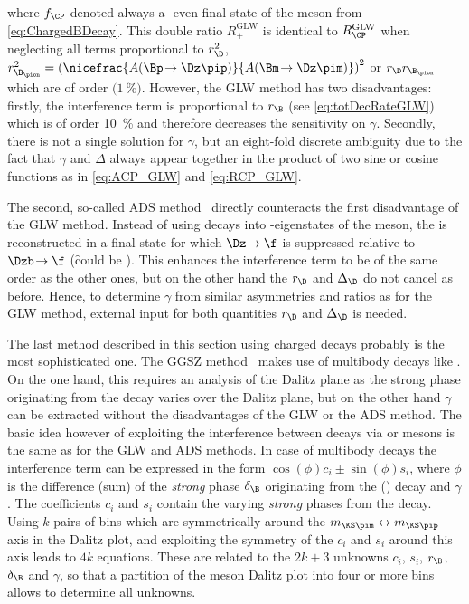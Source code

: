  where $f_{\CP}$ denoted always a \CP-even final state of the \D meson from \cref{eq:ChargedBDecay}.
This double ratio $R_{+}^{\text{GLW}}$ is identical to $R_{\CP}^{\text{GLW}}$ when neglecting all terms proportional to $r_\D^2$, $r_{\B_\pion}^2=\left(\nicefrac{A\!\left(\Bp\!\to\Dz\pip\right)}{A\!\left(\Bm\!\to\Dz\pim\right)}\right)^2$ or $r_\D r_{\B_\pion}$ which are of order $\mathcal(\SI{1}{\percent})$.
However, the GLW method has two disadvantages: firstly, the interference term is proportional to $r_\B$ (see \cref{eq:totDecRateGLW}) which is of order \SI{10}{\percent} and therefore decreases the sensitivity on $\gamma$.
Secondly, there is not a single solution for $\gamma$, but an eight-fold discrete ambiguity due to the fact that $\gamma$ and $\Delta$ always appear together in the product of two sine or cosine functions as in \cref{eq:ACP_GLW} and \cref{eq:RCP_GLW}.

The second, so-called ADS method~\cite{ADS} directly counteracts the first disadvantage of the GLW method.
Instead of using decays into \CP-eigenstates of the \D meson, the \D is reconstructed in a final state for which $\Dz\!\to\f$ is suppressed relative to $\Dzb\!\to\f$ (\eg \f could be \Km\pip).
This enhances the interference term to be of the same order as the other ones, but on the other hand the $r_\D$ and $\Delta_\D$ do not cancel as before.
Hence, to determine $\gamma$ from similar asymmetries and ratios as for the GLW method, external input for both quantities $r_\D$ and $\Delta_\D$ is needed.

The last method described in this section using charged \B decays probably is the most sophisticated one.
The GGSZ method~\cite{Giri:2003ty} makes use of multibody \D decays like \KS\pip\pim.
On the one hand, this requires an analysis of the Dalitz plane as the strong phase originating from the \D decay varies over the Dalitz plane, but on the other hand $\gamma$ can be extracted without the disadvantages of the GLW or the ADS method.
The basic idea however of exploiting the interference between \Bp decays via \Dz or \Dzb mesons is the same as for the GLW and ADS methods.
In case of multibody \D decays the interference term can be expressed in the form $\cos\!\left(\phi\right)c_i\pm\sin\!\left(\phi\right)s_i$, where $\phi$ is the difference (sum) of the \emph{strong} phase $\delta_\B$ originating from the \Bm (\Bp) decay and $\gamma$.
The coefficients $c_i$ and $s_i$ contain the varying \emph{strong} phases from the \D decay.
Using $k$ pairs of bins which are symmetrically around the $m_{\KS\pim}\leftrightarrow m_{\KS\pip}$ axis in the Dalitz plot, and exploiting the symmetry of the $c_i$ and $s_i$ around this axis leads to $4k$ equations.
These are related to the $2k+3$ unknowns $c_i$, $s_i$, $r_\B$, $\delta_\B$ and $\gamma$, so that a partition of the \D meson Dalitz plot into four or more bins allows to determine all unknowns.

